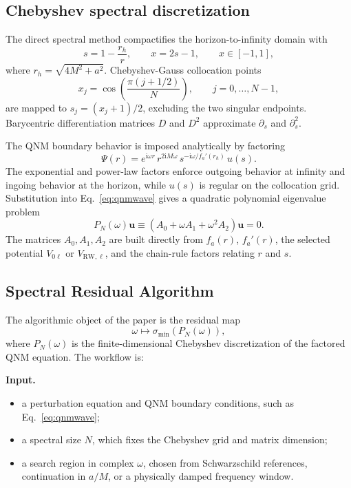 \documentclass[10pt,letterpaper,twocolumn]{article}
\newcommand{\ii}{\mathrm{i}}
\begin{document}
\subsection{Chebyshev spectral discretization}

The direct spectral method compactifies the horizon-to-infinity domain with
\begin{equation}
s=1-\frac{r_h}{r},\qquad x=2s-1,\qquad x\in[-1,1],
\end{equation}
where \(r_h=\sqrt{4M^2+a^2}\). Chebyshev-Gauss collocation points
\begin{equation}
x_j=\cos\left(\frac{\pi(j+1/2)}{N}\right),\qquad j=0,\ldots,N-1,
\end{equation}
are mapped to \(s_j=(x_j+1)/2\), excluding the two singular endpoints. Barycentric differentiation matrices \(D\) and \(D^2\) approximate \(\partial_s\) and \(\partial_s^2\).

The QNM boundary behavior is imposed analytically by factoring
\begin{equation}
\Psi(r)=
e^{\ii\omega r}\,
r^{2\ii M\omega}\,
s^{-\ii\omega/f_a'(r_h)}\,u(s).
\label{eq:factoredfield}
\end{equation}
The exponential and power-law factors enforce outgoing behavior at infinity and ingoing behavior at the horizon, while \(u(s)\) is regular on the collocation grid. Substitution into Eq.~\eqref{eq:qnmwave} gives a quadratic polynomial eigenvalue problem
\begin{equation}
P_N(\omega)\bm{u}
\equiv
\left(A_0+\omega A_1+\omega^2A_2\right)\bm{u}=0.
\label{eq:polynomialproblem}
\end{equation}
The matrices \(A_0,A_1,A_2\) are built directly from \(f_a(r)\), \(f_a'(r)\), the selected potential \(V_{0\ell}\) or \(V_{\mathrm{RW},\ell}\), and the chain-rule factors relating \(r\) and \(s\).

\subsection{Spectral Residual Algorithm}

The algorithmic object of the paper is the residual map
\begin{equation}
\omega \mapsto \sigma_{\min}\!\left(P_N(\omega)\right),
\end{equation}
where \(P_N(\omega)\) is the finite-dimensional Chebyshev discretization of the factored QNM equation. The workflow is:

\textbf{Input.}
\begin{itemize}
\item a perturbation equation and QNM boundary conditions, such as Eq.~\eqref{eq:qnmwave};
\item a spectral size \(N\), which fixes the Chebyshev grid and matrix dimension;
\item a search region in complex \(\omega\), chosen from Schwarzschild references, continuation in \(a/M\), or a physically damped frequency window.
\end{itemize}
\end{document}
